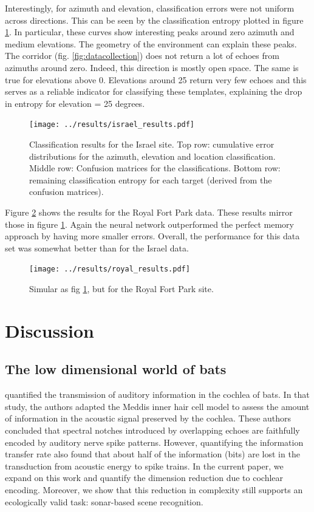 \documentclass[preprint,5p]{elsarticle}
\begin{document}
Interestingly, for azimuth and elevation, classification errors were not uniform across directions. This can be seen by the classification entropy plotted in figure \ref{fig:israelperformance}. In particular, these curves show interesting peaks around zero azimuth and medium elevations. The geometry of the environment can explain these peaks. The corridor (fig. \ref{fig:datacollection}) does not return a lot of echoes from azimuths around zero. Indeed, this direction is mostly open space. The same is true for elevations above 0. Elevations around 25 return very few echoes and this serves as a reliable indicator for classifying these templates, explaining the drop in entropy for elevation = 25 degrees.

\begin{figure}
	\centering
	\texttt{[image: ../results/israel\_results.pdf]}
	\caption{Classification results for the Israel site. Top row: cumulative error distributions for the azimuth, elevation and location classification. Middle row: Confusion matrices for the classifications. Bottom row: remaining classification entropy for each target (derived from the confusion matrices).}
	\label{fig:israelperformance}
\end{figure}

Figure \ref{fig:royalperformance} shows the results for the Royal Fort Park data. These results mirror those in figure \ref{fig:israelperformance}. Again the neural network outperformed the perfect memory approach by having more smaller errors. Overall, the performance for this data set was somewhat better than for the Israel data.

\begin{figure}
	\centering
	\texttt{[image: ../results/royal\_results.pdf]}
	\caption{Simular as fig \ref{fig:israelperformance}, but for the Royal Fort Park site.}
	\label{fig:royalperformance}
\end{figure}


\section{Discussion}

\subsection{The low dimensional world of bats}

\citet{Reijniers2010a} quantified the transmission of auditory information in the cochlea of bats. In that study, the authors adapted the Meddis inner hair cell model \citep{Meddis2006} to assess the amount of information in the acoustic signal preserved by the cochlea. These authors concluded that spectral notches introduced by overlapping echoes are faithfully encoded by auditory nerve
spike patterns. However, quantifying the information transfer rate also found that about half of the information (bits) are lost in the transduction from acoustic energy to spike trains. In the current paper, we expand on this work and quantify the dimension reduction due to cochlear encoding. Moreover, we show that this reduction in complexity still supports an ecologically valid task: sonar-based scene recognition.
\end{document}
